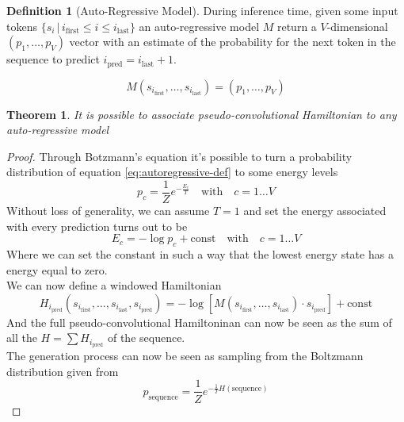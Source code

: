 \documentclass{article}
\newtheorem{theorem}{Theorem}[section]
\theoremstyle{definition}
\newtheorem{definition}{Definition}[section]
\theoremstyle{remark}
\begin{document}
\begin{definition}[Auto-Regressive Model]
    During inference time, given some input tokens $\{s_i\,|\, i_\textrm{first}\le i\le i_\textrm{last}\}$ an auto-regressive model $M$ return a $V$-dimensional $(p_1,\dots,p_V)$ vector with an estimate of the probability for the next token in the sequence to predict $i_\textrm{pred}=i_\textrm{last}+1$.

    \begin{equation}
    \label{eq:autoregressive-def}
        M(s_{i_\textrm{first}},\dots,s_{i_\textrm{last}})=(p_1,\dots,p_V)
    \end{equation}
\end{definition}

\begin{theorem}
    It is possible to associate pseudo-convolutional Hamiltonian to any auto-regressive model
    \label{th:auto=ham}
\end{theorem}
\begin{proof}
    
    Through Botzmann's equation it's possible to turn a probability distribution of equation \ref{eq:autoregressive-def} to some energy levels
    \begin{equation}
        p_c=\frac1Ze^{-\frac{E_c}{T}}\quad\textrm{with}\quad c=1\dots V
    \end{equation}
    Without loss of generality, we can assume $T=1$ and set the energy associated with every prediction turns out to be
    \begin{equation}
        E_c=-\log p_c +\textrm{const} \quad\textrm{with}\quad c=1\dots V
    \end{equation}
    Where we can set the constant in such a way that the lowest energy state has a energy equal to zero.\\
    We can now define a windowed Hamiltonian
    \begin{equation}
        H_{i_\textrm{pred}}(s_{i_\textrm{first}},\dots,s_{i_\textrm{last}},s_{i_\textrm{pred}})=-\log\left[  M(s_{i_\textrm{first}},\dots,s_{i_\textrm{last}})\cdot s_{i_\textrm{pred}}\right]+\textrm{const}
    \end{equation}
    And the full pseudo-convolutional Hamiltoninan can now be seen as the sum of all the $H=\sum H_{i_\textrm{pred}}$ of the sequence.\\
    The generation process can now be seen as sampling from the Boltzmann distribution given from 
    \begin{equation}
        p_\textrm{sequence}=\frac 1Z 
        e^{-\frac 1TH(\textrm{sequence})}
    \end{equation}
\end{proof}
\end{document}
